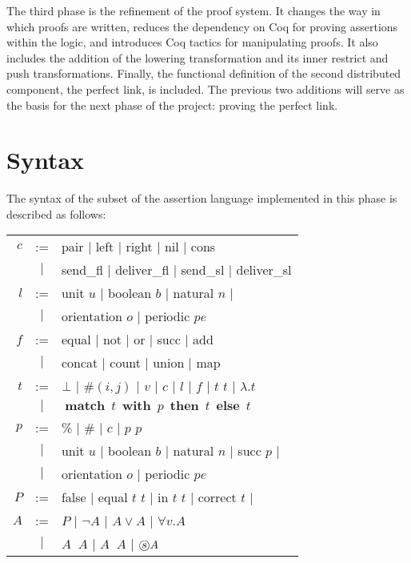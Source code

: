 \documentclass[12pt]{article}
\DeclareMathOperator{\tmatch}{\mathbf{match}}
\DeclareMathOperator{\twith}{\mathbf{with}}
\DeclareMathOperator{\tthen}{\mathbf{then}}
\DeclareMathOperator{\telse}{\mathbf{else}}
\DeclareMathOperator{\AuntilS}{\hat{\mathcal{U}}}
\DeclareMathOperator{\AsinceS}{\hat{\mathcal{S}}}
\newcommand\Aself{\stackMath\mathbin{\stackinset{c}{0ex}{c}{0ex}{s}{\bigcirc}}}
\newcommand{\Match}[4]{
  \tmatch\ #1\ \twith\ #2\ \tthen\ #3\ \telse\ #4
}
\begin{document}
The third phase is the refinement of the proof system.  It changes the
way in which proofs are written, reduces the dependency on Coq for
proving assertions within the logic, and introduces Coq tactics for
manipulating proofs.  It also includes the addition of the lowering
transformation and its inner restrict and push transformations.
Finally, the functional definition of the second distributed component,
the perfect link, is included.  The previous two additions will serve as
the basis for the next phase of the project: proving the perfect link.

\section{Syntax}

The syntax of the subset of the assertion language implemented in this
phase is described as follows:

\begin{center}
  \begin{tabular}{rcl}
    $c$ & := &
      pair $\vert$
      left $\vert$
      right $\vert$
      nil $\vert$
      cons
      \\ & $\vert$ &
      send_fl $\vert$
      deliver_fl $\vert$
      send_sl $\vert$
      deliver_sl \\
    $l$ & := &
      unit $u$ $\vert$
      boolean $b$ $\vert$
      natural $n$ $\vert$
      \\ & $\vert$ &
      orientation $o$ $\vert$
      periodic $pe$ \\
    $f$ & := &
      equal $\vert$
      not $\vert$
      or $\vert$
      succ $\vert$
      add
      \\ & $\vert$ &
      concat $\vert$
      count $\vert$
      union $\vert$
      map \\
    $t$ & := &
      $\bot$ $\vert$
      $\#(i, j)$ $\vert$
      $v$ $\vert$
      $c$ $\vert$
      $l$ $\vert$
      $f$ $\vert$
      $t$ $t$ $\vert$
      $\lambda. t$
      \\ & $\vert$ &
      $\Match{t}{p}{t}{t}$ \\
    $p$ & := &
      \% $\vert$
      \# $\vert$
      $c$ $\vert$
      $p$ $p$
      \\ & $\vert$ &
      unit $u$ $\vert$
      boolean $b$ $\vert$
      natural $n$ $\vert$
      succ $p$ $\vert$
      \\ & $\vert$ &
      orientation $o$ $\vert$
      periodic $pe$ \\
    $P$ & := &
      false $\vert$
      equal $t$ $t$ $\vert$
      in $t$ $t$ $\vert$
      correct $t$ $\vert$ \\
    $A$ & := &
      $P$ $\vert$
      $\neg A$ $\vert$
      $A \vee A$ $\vert$
      $\forall v. A$
      \\ & $\vert$ &
      $A \AuntilS A$ $\vert$
      $A \AsinceS A$ $\vert$
      $\Aself A$
  \end{tabular}
\end{center}
\end{document}
